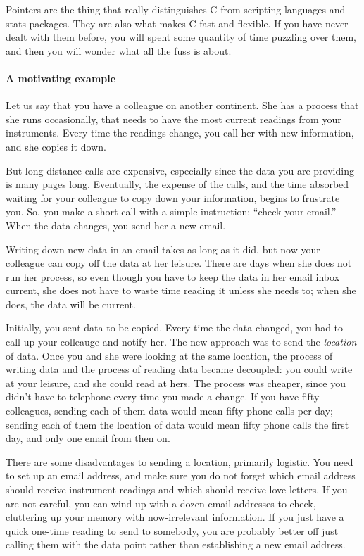 Pointers are the thing that really distinguishes C from scripting
languages and stats packages. They are also what makes C fast and
flexible. If you have never dealt with them before, you will spent some
quantity of time puzzling over them, and then you will wonder what all the
fuss is about. 

\paragraph{A motivating example} Let us say that you have a colleague on
another continent. She has a process that she runs occasionally,
that needs to have the most current readings from your instruments.
Every time the readings change, you call her with new information,
and she copies it down.

But long-distance calls are expensive, especially
since the data you are providing is many pages long.
Eventually, the expense of the calls, and the time absorbed waiting for
your colleague to copy down your information, begins to frustrate you.
So, you make a short call with a simple instruction: ``check your
email.'' When the data changes, you send her a new email.

Writing down new data in an email takes as long as it
did, but now your colleague can copy off the data at her leisure.
There are days when she does not run her process, so even though you
have to keep the data in her email inbox current, she does not have to
waste time reading it unless she needs to; when she does, the data
will be current.

Initially, you sent data to be copied. Every time the data changed, you
had to call up your colleauge and notify her. The new approach was to
send the {\em location} of data. Once you and she were looking at the
same location, the process of writing data and the process of reading
data became decoupled: you could write at your leisure, and she could
read at hers. The process was cheaper, since you didn't have to
telephone every time you made a change. If you have fifty colleagues,
sending each of them data would mean fifty phone calls per day; sending
each of them the location of data would mean fifty phone calls the first
day, and only one email from then on.


There are some disadvantages to sending a location, primarily logistic.
You need to set up an email address, and make
sure you do not forget which email address should receive instrument
readings and which should receive love letters. If you are not careful,
you can wind up with a dozen email addresses to check, cluttering up
your memory with now-irrelevant information. If you just have a
quick one-time reading to send to somebody, you are probably better off 
just calling them with the data point rather than establishing a new
email address.

